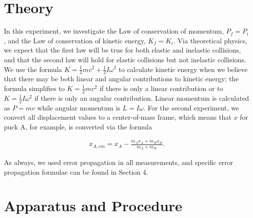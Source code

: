 \documentclass[11pt]{article}
\begin{document}
\section{Theory}
In this experiment, we investigate the Law of conservation of momentum, $P_f=P_i$, and the Law of conservation of kinetic energy, $K_f=K_i$. Via theoretical physics, we expect that the first law will be true for both elastic and inelastic collisions, and that the second law will hold for elastic collisions but not inelastic collisions. We use the formula $K=\frac{1}{2}mv^2+\frac{1}{2}I\omega^2$ to calculate kinetic energy when we believe that there may be both linear and angular contributions to kinetic energy; the formula simplifies to $K=\frac{1}{2}mv^2$ if there is only a linear contribution or to $K=\frac{1}{2}I\omega^2$ if there is only an angular contribution. Linear momentum is calculated as $P=mv$ while angular momentum is $L=I\omega$. For the second experiment, we convert all displacement values to a center-of-mass frame, which means that $x$ for puck A, for example, is converted via the formula

\begin{align}
x_{A,cm}=x_A-\frac{m_A x_A+ m_B x_B}{m_A + m_B}.
\end{align}

As always, we used error propagation in all measurements, and specific error propagation formulae can be found in Section 4.

\section{Apparatus and Procedure}

\end{document}
